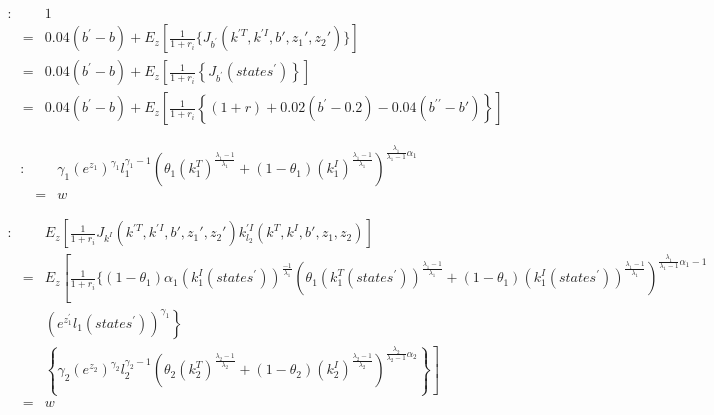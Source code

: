 \documentclass{article}
\begin{document}
\begin{eqnarray}
     [b^{\prime }]: & &   1 \nonumber \\
     & = &  0.04(b^\prime - b) +  E_z\left[\frac{1}{1+r_i} \{ J_{b^{\prime}}(k^{\prime T},k^{\prime I},b{\prime},z_{1}{\prime },z_{2}{\prime}) \}  \right] \nonumber \\
     & = &  0.04(b^\prime - b) +  E_z\left[\frac{1}{1+r_i} \left\lbrace  J_{b^{\prime}}(states^\prime) \right\rbrace  \right] \nonumber \\
     & = &  0.04(b^\prime - b) +  E_z\left[\frac{1}{1+r_i} \left\lbrace  (1+r) + 0.02(b^\prime - 0.2) - 0.04(b^{\prime \prime} -b\prime) \right\rbrace  \right] \quad \quad
\end{eqnarray}

\begin{eqnarray}
     [l_1]: & &  \gamma_1 (e^{z_1})^{\gamma_1} l_1^{\gamma_1 - 1} \left( \theta_1 (k_{1}^T)^{\frac{\lambda_1-1}{\lambda_1}} +(1-\theta_1)(k_{1}^I)^{\frac{\lambda_1-1}{\lambda_1}} \right)^{\frac{\lambda_1}{\lambda_1-1}\alpha_1}  \quad \quad \quad \quad \quad  \nonumber \\
     & = &  w  \quad \quad
\end{eqnarray}

\begin{eqnarray}
     [l_2]: &  &  E_z\left[\frac{1}{1+r_i} J_{k^I}(k^{\prime T},k^{\prime I},b{\prime},z_{1}{\prime },z_{2}{\prime}) k_{l_2}^{\prime I}(k^{T},k^{I},b{\prime},z_{1},z_{2})  \right] \nonumber \\
     & = &  E_z \left[ \frac{1}{1+r_i} \{ (1-\theta_1) \alpha_1 (k_{1}^I(states^\prime) )^{\frac{-1}{\lambda_1}}    \left( \theta_1 (k_{1}^T(states^\prime) )^{\frac{\lambda_1-1}{\lambda_1}} +(1-\theta_1)(k_{1}^I(states^\prime) )^{\frac{\lambda_1-1}{\lambda_1}} \right)^{\frac{\lambda_1}{\lambda_1-1}\alpha_1-1} \right. \nonumber \\
     &  &  \left.  \left( e^{z_{1}^\prime}l_{1}(states^\prime) \right)^{\gamma_1}  \right\rbrace    \nonumber \\
     &  &  \left.  \left\lbrace \gamma_2 (e^{z_2 })^{\gamma_2} l_2^{\gamma_2 - 1} \left( \theta_2 (k_{2}^T)^{\frac{\lambda_2-1}{\lambda_2}} +(1-\theta_2)(k_{2}^I)^{\frac{\lambda_2-1}{\lambda_2}} \right)^{\frac{\lambda_2}{\lambda_2-1}\alpha_2} \right\rbrace  \right] \nonumber \\
     & = &  w 
\end{eqnarray}
\end{document}
